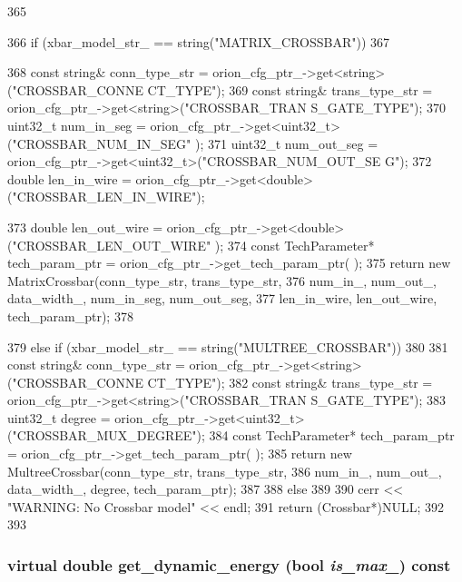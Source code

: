 \begin{DoxyCode}
365 {
366     if (xbar_model_str_ == string("MATRIX_CROSSBAR"))
367     {
368         const string& conn_type_str = orion_cfg_ptr_->get<string>("CROSSBAR_CONNE
      CT_TYPE");
369         const string& trans_type_str = orion_cfg_ptr_->get<string>("CROSSBAR_TRAN
      S_GATE_TYPE");
370         uint32_t num_in_seg = orion_cfg_ptr_->get<uint32_t>("CROSSBAR_NUM_IN_SEG"
      );
371         uint32_t num_out_seg = orion_cfg_ptr_->get<uint32_t>("CROSSBAR_NUM_OUT_SE
      G");
372         double len_in_wire = orion_cfg_ptr_->get<double>("CROSSBAR_LEN_IN_WIRE");
      
373         double len_out_wire = orion_cfg_ptr_->get<double>("CROSSBAR_LEN_OUT_WIRE"
      );
374         const TechParameter* tech_param_ptr = orion_cfg_ptr_->get_tech_param_ptr(
      );
375         return new MatrixCrossbar(conn_type_str, trans_type_str, 
376                 num_in_, num_out_, data_width_, num_in_seg, num_out_seg,
377                 len_in_wire, len_out_wire, tech_param_ptr);
378     }
379     else if (xbar_model_str_ == string("MULTREE_CROSSBAR"))
380     {
381         const string& conn_type_str = orion_cfg_ptr_->get<string>("CROSSBAR_CONNE
      CT_TYPE");
382         const string& trans_type_str = orion_cfg_ptr_->get<string>("CROSSBAR_TRAN
      S_GATE_TYPE");
383         uint32_t degree = orion_cfg_ptr_->get<uint32_t>("CROSSBAR_MUX_DEGREE");
384         const TechParameter* tech_param_ptr = orion_cfg_ptr_->get_tech_param_ptr(
      );
385         return new MultreeCrossbar(conn_type_str, trans_type_str, 
386                 num_in_, num_out_, data_width_, degree, tech_param_ptr);
387     }
388     else
389     {
390         cerr << "WARNING: No Crossbar model" << endl;
391         return (Crossbar*)NULL;
392     }
393 }
\end{DoxyCode}
\hypertarget{classCrossbar_ac2104354778bb800a8854b9386a66fbe}{
\subsubsection[{get\_\-dynamic\_\-energy}]{\setlength{\rightskip}{0pt plus 5cm}virtual double get\_\-dynamic\_\-energy (bool {\em is\_\-max\_\-}) const}}
\label{classCrossbar_ac2104354778bb800a8854b9386a66fbe}


